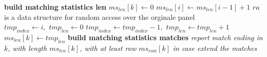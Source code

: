 \begin{algorithm}
\begin{algorithmic}[1]
    \EndIf
    \EndFor
    \Comment \textbf{build matching statistics len}
    \For {\textit{every} $k\in[0,|ms_{row}|)$}
    \State $ms_{len}[k]\gets 0$
    \State $ms_{len}[i]\gets ms_{len}[i-1]+1$
    \Else
    \Comment $ra$ is a data structure for random access over the orginale panel
    \State $tmp_{index}\gets i,\,\,tmp_{len}\gets 0$
    \State $tmp_{index}\gets tmp_{index}-1,\,\,tmp_{len}\gets tmp_{len}+1$
    \EndWhile
    \State $ms_{len}[k]\gets tmp_{len}$
    \EndIf
    \EndFor
    \For {\textit{every} $k\in[0,|ms_{row}|)$}
    \Comment \textbf{build matching statistics matches}
    \State \textit{report match ending in $k$, with length $ms_{len}[k]$, with
    at least row $ms_{row}[k]$}
    \EndIf
    \EndFor
    \textit{in case extend the matches}
    \EndFunction
  \end{algorithmic}
  \caption{Algoritmo per match con matching-statistics (MS) e thresholds}
  \label{algo:matchthr}
\end{algorithm}

